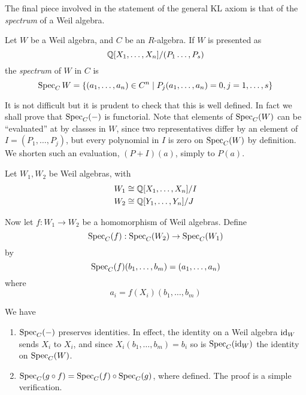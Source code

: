The final piece involved in the statement of the general KL axiom is that of the \emph{spectrum} of a Weil algebra.
\begin{defn}
  Let \( W \) be a Weil algebra, and \( C \) be an \( R \)-algebra. If \( W \) is presented as 
  \begin{equation*}
    \mathbb{Q}[X_1,\dots,X_n]/(P_1\dots,P_s)
  \end{equation*}
  the \emph{spectrum} of \( W \) in \( C \) is
  \begin{equation*}
    \operatorname{Spec}_C{W} = \{(a_1,\dots,a_n)\in C^n \mid P_j(a_1,\dots,a_n) = 0, j=1,\dots,s\} 
    \label{def:spec}
  \end{equation*}
\end{defn}
It is not difficult but it is prudent to check that this is well defined. In fact we shall prove that \( \operatorname{Spec}_C(-) \) is functorial. Note that elements of \( \operatorname{Spec}_C(W) \) can be ``evaluated'' at by classes in \( W \), since two representatives differ by an element of \( I=(P_1,\dots,P_j) \), but every polynomial in \( I \) is zero on \( \operatorname{Spec}_C(W) \) by definition. We shorten such an evaluation, \( (P+I)(a) \), simply to \( P(a) \). 

Let \( W_1, W_2 \) be Weil algebras, with
\begin{align*}
  W_1 &\cong \mathbb{Q}[X_1,\dots,X_n]/I \\
  W_2 &\cong \mathbb{Q}[Y_1,\dots,Y_n]/J
\end{align*}

Now let \( f:W_1\to W_2 \) be a homomorphism of Weil algebras. Define
\begin{equation*}
  \operatorname{Spec}_C(f):\operatorname{Spec}_C(W_2)\to \operatorname{Spec}_C(W_1)
\end{equation*}
by
\begin{equation*}
  \operatorname{Spec}_C(f)(b_1,\dots,b_m) = (a_1,\dots,a_n)
\end{equation*}
where
\begin{equation*}
  a_i = f(X_i)(b_1,\dots,b_m)
\end{equation*}

We have
\begin{enumerate}
  \item \(\operatorname{Spec}_C(-)\) preserves identities.
    In effect, the identity on a Weil algebra \( \operatorname{id}_W \) sends \( X_i \) to \( X_i \), and since \( X_i(b_1,\dots,b_m) = b_i \) so is \( \operatorname{Spec}_C(\operatorname{id}_W) \) the identity on \( \operatorname{Spec}_C(W) \).
  \item \(\operatorname{Spec}_C(g\circ f) = \operatorname{Spec}_C(f)\circ \operatorname{Spec}_C(g)\), where defined. The proof is a simple verification.
\end{enumerate}

